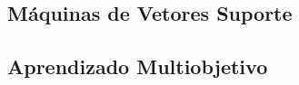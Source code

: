 \documentclass[conference]{IEEEtran}
\begin{document}
	\subsection{Máquinas de Vetores Suporte}
	\subsection{Aprendizado Multiobjetivo}


	
    
	
	
\end{document}
